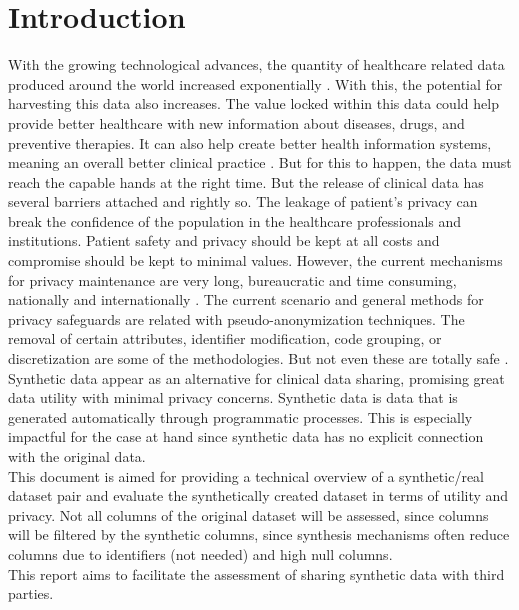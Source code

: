 \documentclass{article}
\begin{document}


\cleardoublepage

\tableofcontents
\newpage
\cleardoublepage
\listoffigures
\listoftables
\cleardoublepage
\section{Introduction}


With the growing technological advances, the quantity of healthcare related data produced around the world increased exponentially \cite{choi_generating_2017,henry_adoption_2016}.
With this, the potential for harvesting this data also increases. The value locked within this data could help provide better healthcare with new information about diseases,
drugs, and preventive therapies. It can also help create better health information systems, meaning an overall better clinical practice \cite{ISI:000502534100049}. But for this to happen, the data must reach the capable hands at the right time.
But the release of clinical data has several barriers attached and rightly so. The leakage of patient’s privacy can break the confidence of the population in the healthcare professionals and institutions. Patient safety
and privacy should be kept at all costs and compromise should be kept to minimal values. However, the current mechanisms for privacy maintenance are very long, bureaucratic and time consuming, nationally \cite{comissao_nacional_protecao_de_dados_principios_2015} and internationally \cite{office_for_civil_rights_guidance_2013}. The current scenario and general methods for privacy safeguards are related with pseudo-anonymization techniques.
The removal of certain attributes, identifier modification, code grouping, or discretization are some of the methodologies. But not even these are totally safe \cite{el_emam_systematic_2011}.
Synthetic data appear as an alternative for clinical data sharing, promising great data utility with minimal privacy concerns. Synthetic data is data that is generated automatically through programmatic processes. This is especially impactful for the case at hand since synthetic data has no explicit connection with the original data.\\
This document is aimed for providing a technical overview of a synthetic/real dataset pair and evaluate the synthetically created dataset in terms of utility and privacy.
Not all columns of the original dataset will be assessed, since columns will be filtered by the synthetic columns, since synthesis mechanisms often reduce columns due to identifiers (not needed) and high null columns. \\
This report aims to facilitate the assessment of sharing synthetic data with third parties.
\end{document}

